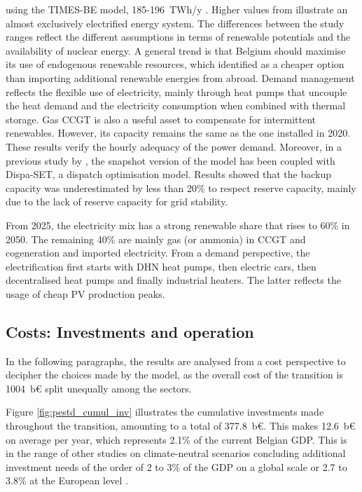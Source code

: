 using the TIMES-BE model, 185-196~TWh/y \cite{PATHS2050}. Higher values from \citet{Devogelaer2013} illustrate an almost exclusively electrified energy system. The differences between the study ranges reflect the different assumptions in terms of renewable potentials and the availability of nuclear energy. A general trend is that Belgium should maximise its use of endogenous renewable resources, which \citet{dubois2023multi} identified as a cheaper option than importing additional renewable energies from abroad. Demand management reflects the flexible use of electricity, mainly through heat pumps that uncouple the heat demand and the electricity consumption when combined with thermal storage. Gas \gls{CCGT} is also a useful asset to compensate for intermittent renewables. However, its capacity remains the same as the one installed in 2020. These results verify the hourly adequacy of the power demand. Moreover, in a previous study by \citet{pavivcevic2022bidirectionnal}, the snapshot version of the model has been coupled with Dispa-SET, a dispatch optimisation model. Results showed that the backup capacity was underestimated by less than 20\% to respect reserve capacity, mainly due to the lack of reserve capacity for grid stability.  

From 2025, the electricity mix has a strong renewable share that rises to 60\% in 2050. The remaining 40\% are mainly gas (or ammonia) in \gls{CCGT} and cogeneration and imported electricity. From a demand perspective, the electrification first starts with \gls{DHN} heat pumps, then electric cars, then decentralised heat pumps and finally industrial heaters. The latter reflects the usage of cheap \gls{PV} production peaks. 

\subsection{Costs: Investments and operation}

In the following paragraphs, the results are analysed from a cost perspective to decipher the choices made by the model, as the overall cost of the transition is 1004~b€ split unequally among the sectors. 

Figure \ref{fig:pestd_cumul_inv} illustrates the cumulative investments made throughout the transition, amounting to a total of 377.8~b€. This makes 12.6~b€ on average per year, which represents 2.1\% of the current Belgian \gls{GDP}. This is in the range of other studies on climate-neutral scenarios concluding additional investment needs of the order of 2 to 3\% of the \gls{GDP} on a global scale \cite{IEA2021,IRENA2021} or 2.7 to 3.8\% at the European level \cite{Widuto2023}.

